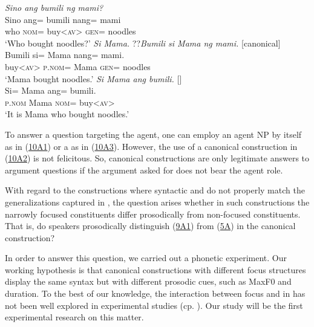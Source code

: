 \documentclass[output=paper]{langsci/langscibook}
\begin{document}
\begin{exe}
\ex\label{e:nagaya:10}
\begin{xlist}
	\textit{Sino ang bumili ng mami?}\\
	\gll Sino  ang=  b{\USSmaller}um{\USGreater}ili    nang=    mami{\USQMark}\\
	who  \textsc{nom}=  buy<\textsc{av}>    \textsc{gen}=    noodles\\
	\glt ‘Who bought noodles?’
	 \label{e10a1}
	\textit{Si Mama.}
	 \label{e10a2}
	??\textit{Bumili si Mama ng mami.}  [canonical]\\
	\gll B{\USSmaller}um{\USGreater}ili  si=  Mama    nang=  mami.\\
	buy<\textsc{av}>  \textsc{p.nom}= Mama  \textsc{gen}=  noodles\\
	\glt ‘Mama bought noodles.’
	 \label{e10a3}
	\textit{Si Mama ang bumili.} []\\
	\gll Si=  Mama    ang=  b{\USSmaller}um{\USGreater}ili.\\
	\textsc{p.nom} Mama    \textsc{nom}=  buy<\textsc{av}>\\
	\glt ‘It is Mama who bought noodles.’
\end{xlist}
\end{exe}

\noindent
To answer a question targeting the agent, one can employ an agent NP by itself as in (\hyperref[e10a1]{10A1}) or a  as in (\hyperref[e10a3]{10A3}). However, the use of a canonical construction in (\hyperref[e10a2]{10A2}) is not felicitous. So, canonical constructions are only legitimate answers to argument questions if the argument asked for does not bear the agent role.
	
With regard to the constructions where syntactic and  do not properly match the generalizations captured in , the question arises whether in such constructions the narrowly focused constituents differ prosodically from non-focused constituents. That is, do  speakers prosodically distinguish  (\hyperref[e9a1]{9A1}) from  (\hyperref[e:nagaya:5a]{5A}) in the canonical construction?

In order to answer this question, we carried out a phonetic experiment. Our working hypothesis is that canonical constructions with different focus structures display the same syntax but with different prosodic cues, such as MaxF0 and duration. To the best of our knowledge, the interaction between focus and  in  has not been well explored in experimental studies (cp. \citealt{Kaufman2005}). Our study will be the first experimental research on this matter.
\end{document}
